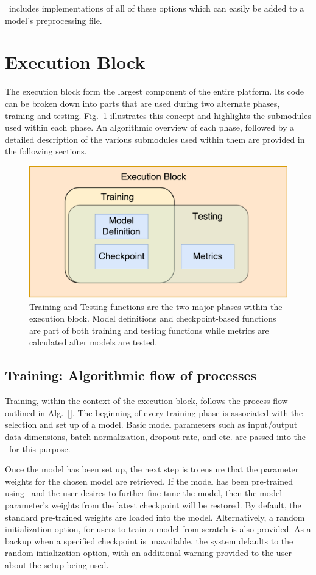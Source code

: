 \documentclass{llncs}
\begin{document}
\acro~includes implementations of all of these options which can easily be added to a model's preprocessing file.



\section{Execution Block}
\label{sec:execblock}
The execution block form the largest component of the entire platform. Its code can be broken down into parts that are used during two alternate phases, training and testing.
Fig.~\ref{fig:exec_block} illustrates this concept and highlights the submodules used within each phase.
An algorithmic overview of each phase, followed by a detailed description of the various submodules used within them are provided in the following sections.

\begin{figure}[t!]
\centering
\includegraphics[width=0.8\columnwidth]{images/exec_block.pdf}
\caption{Training and Testing functions are the two major phases within the execution block. Model definitions and checkpoint-based functions are part of both training and testing functions while metrics are calculated after models are tested.}
\label{fig:exec_block}
\end{figure}

\subsection{Training: Algorithmic flow of processes}
\label{sec:training}
Training, within the context of the execution block, follows the process flow outlined in Alg.~\ref{}.
The beginning of every training phase is associated with the selection and set up of a model. 
Basic model parameters such as input/output data dimensions, batch normalization, dropout rate, and etc. are passed into the \model~for this purpose.

Once the model has been set up, the next step is to ensure that the parameter weights for the chosen model are retrieved. 
If the model has been pre-trained using \acro~and the user desires to further fine-tune the model, then the model parameter's weights from the latest checkpoint will be restored.
By default, the standard pre-trained weights are loaded into the model.
Alternatively, a random initialization option, for users to train a model from scratch is also provided. 
As a backup when a specified checkpoint is unavailable, the system defaults to the random intialization option, with an additional warning provided to the user about the setup being used.
\end{document}
